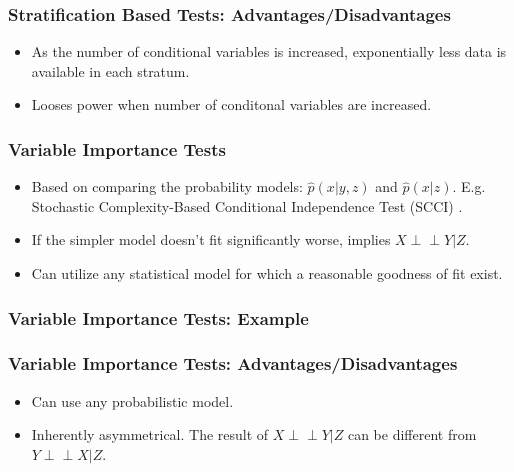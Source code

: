 \documentclass{beamer}
\def\ci{\perp\!\!\!\!\!\perp}
\begin{document}
\begin{frame}
	\frametitle{Stratification Based Tests: Advantages/Disadvantages}
	\begin{itemize}
		\item As the number of conditional variables is increased, exponentially
			less data is available in each stratum.
		\item Looses power when number of conditonal variables
			are increased.
	\end{itemize}
\end{frame}

\begin{frame}
	\frametitle{Variable Importance Tests}
	\begin{itemize}
		\setlength\itemsep{1em}
		\item Based on comparing the probability models: $\hat{p}(x |
			y, z) $ and $ \hat{p}(x | z) $. E.g. Stochastic
			Complexity-Based Conditional Independence Test (SCCI) \footnotemark.
		\item If the simpler model doesn't fit significantly worse, implies $ X \ci Y | Z $.
		\item Can utilize any statistical model for which a reasonable goodness
			of fit exist.
	\end{itemize}

\end{frame}

\begin{frame}
	\frametitle{Variable Importance Tests: Example}
\end{frame}

\begin{frame}
	\frametitle{Variable Importance Tests: Advantages/Disadvantages}
	\begin{itemize}
		\item Can use any probabilistic model.
		\item Inherently asymmetrical. The result of $ X \ci Y | Z $
			can be different from $ Y \ci X | Z $.
	\end{itemize}

\end{frame}
\end{document}
